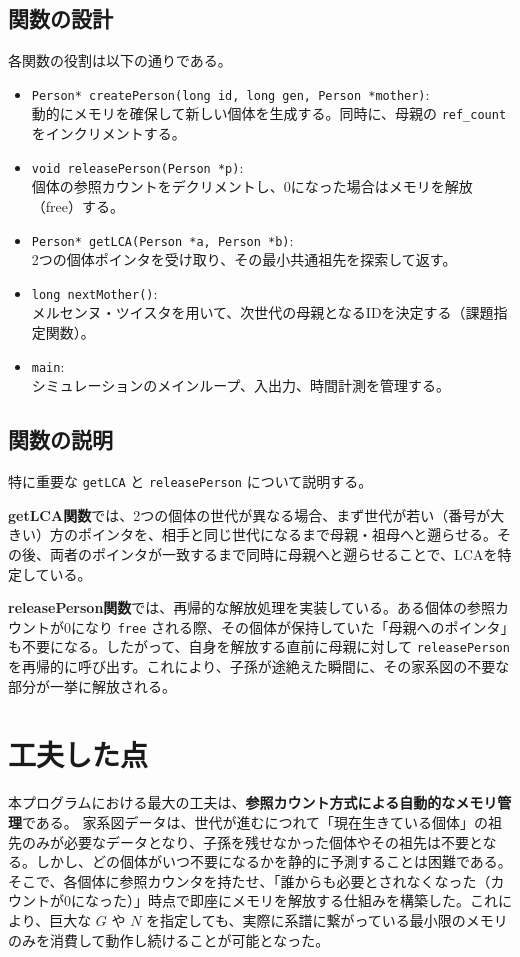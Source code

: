 \documentclass[a4paper,11pt]{jsarticle}
\begin{document}
\subsection{関数の設計}
各関数の役割は以下の通りである。
\begin{itemize}
    \item \texttt{Person* createPerson(long id, long gen, Person *mother)}: \\
    動的にメモリを確保して新しい個体を生成する。同時に、母親の \texttt{ref\_count} をインクリメントする。
    \item \texttt{void releasePerson(Person *p)}: \\
    個体の参照カウントをデクリメントし、0になった場合はメモリを解放（free）する。
    \item \texttt{Person* getLCA(Person *a, Person *b)}: \\
    2つの個体ポインタを受け取り、その最小共通祖先を探索して返す。
    \item \texttt{long nextMother()}: \\
    メルセンヌ・ツイスタを用いて、次世代の母親となるIDを決定する（課題指定関数）。
    \item \texttt{main}: \\
    シミュレーションのメインループ、入出力、時間計測を管理する。
\end{itemize}

\subsection{関数の説明}
特に重要な \texttt{getLCA} と \texttt{releasePerson} について説明する。

\textbf{getLCA関数}では、2つの個体の世代が異なる場合、まず世代が若い（番号が大きい）方のポインタを、相手と同じ世代になるまで母親・祖母へと遡らせる。その後、両者のポインタが一致するまで同時に母親へと遡らせることで、LCAを特定している。

\textbf{releasePerson関数}では、再帰的な解放処理を実装している。ある個体の参照カウントが0になり \texttt{free} される際、その個体が保持していた「母親へのポインタ」も不要になる。したがって、自身を解放する直前に母親に対して \texttt{releasePerson} を再帰的に呼び出す。これにより、子孫が途絶えた瞬間に、その家系図の不要な部分が一挙に解放される。

\section{工夫した点}
本プログラムにおける最大の工夫は、\textbf{参照カウント方式による自動的なメモリ管理}である。
家系図データは、世代が進むにつれて「現在生きている個体」の祖先のみが必要なデータとなり、子孫を残せなかった個体やその祖先は不要となる。しかし、どの個体がいつ不要になるかを静的に予測することは困難である。
そこで、各個体に参照カウンタを持たせ、「誰からも必要とされなくなった（カウントが0になった）」時点で即座にメモリを解放する仕組みを構築した。これにより、巨大な $G$ や $N$ を指定しても、実際に系譜に繋がっている最小限のメモリのみを消費して動作し続けることが可能となった。
\end{document}
